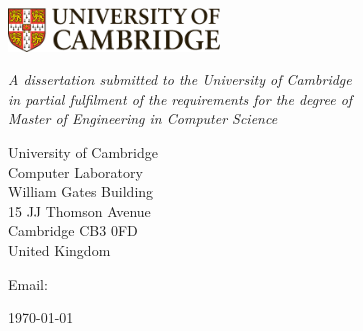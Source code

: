 \begin{titlepage} 

\begin{center}
\vspace*{1mm}
\noindent
\huge
\dissertationtitle \\
\end{center}

\begin{center}
\noindent
\LARGE
\authorname \\
\Large
\authorcollege      \\[34pt]
\includegraphics[width=0.42\textwidth]{figures/cambridge.eps}
\end{center}

\vspace{24pt} 

\begin{center}
\noindent
\large
{\it A dissertation submitted to the University of Cambridge \\ 
in partial fulfilment of the requirements for the degree of \\ 
Master of Engineering in Computer Science} 
\end{center}

\begin{center}
\noindent
University of Cambridge \\
Computer Laboratory     \\
William Gates Building  \\
15 JJ Thomson Avenue    \\
Cambridge CB3 0FD       \\
{\sc United Kingdom}    \\
\end{center}

\begin{center}
\noindent
Email: \authoremail \\
\end{center}

\begin{center}
\noindent
\today
\end{center}

\end{titlepage} 

\newpage
\vspace*{\fill}

